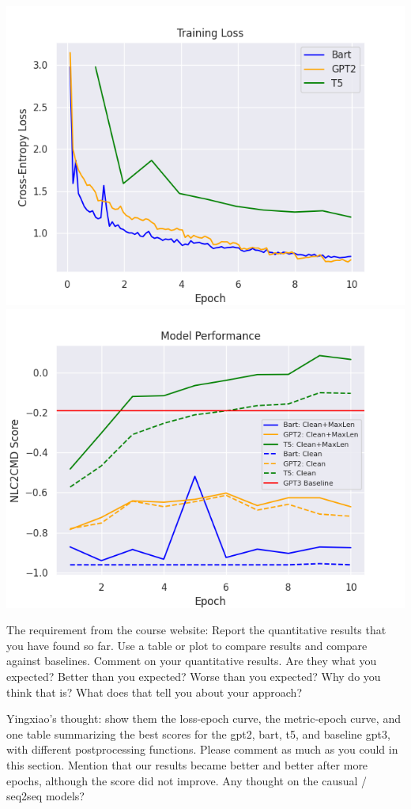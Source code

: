 \documentclass{article}
\begin{document}
\begin{center}
	\includegraphics[scale=0.4]{loss.png}
	\includegraphics[scale=0.4]{metric.png}
\end{center}
The requirement from the course website: Report the quantitative results that you have found so far. Use a table or plot to compare results and compare against baselines.
Comment on your quantitative results. Are they what you expected? Better than you expected? Worse than you expected? Why do you think that is? What does that tell you about your approach?

Yingxiao's thought: show them the loss-epoch curve, the metric-epoch curve, and one table summarizing the best scores for the gpt2, bart, t5, and baseline gpt3, with different postprocessing functions. Please comment as much as you could in this section. Mention that our results became better and better after more epochs, although the score did not improve. Any thought on the causual / seq2seq models?
\end{document}
